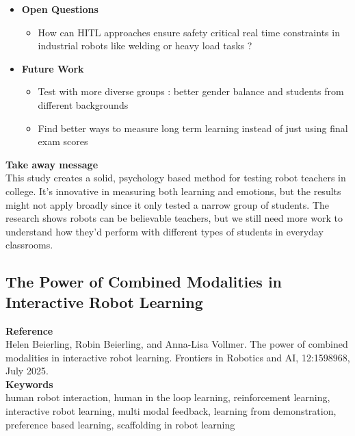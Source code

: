 \documentclass[report.tex]{subfiles}
\begin{document}
\begin{itemize}
    \item \noindent\textbf {Open Questions}
    \begin{itemize}
        \item    How can HITL approaches ensure safety critical real time constraints in industrial robots like welding or heavy load tasks ?

    \end{itemize}
    
    \item \noindent\textbf{Future Work}
    \begin{itemize}
        \item Test with more diverse groups  : better gender balance and students from different backgrounds 
        \item Find better ways to measure long term learning instead of just using final exam scores 
        
    \end{itemize}
\end{itemize}


\noindent\textbf{Take away message}  \\
This study creates a solid, psychology based method for testing robot teachers in college. It's innovative in measuring both learning and emotions, but the results might not apply broadly since it only tested a narrow group of students. The research shows robots can be believable teachers, but we still need more work to understand how they'd perform with different types of students in everyday classrooms. 













\subsection{The Power of Combined Modalities in Interactive Robot Learning} 

\noindent\textbf{Reference} \\
\cite{beierling_power_2025}Helen Beierling, Robin Beierling, and Anna-Lisa Vollmer. The power of combined modalities in
interactive robot learning. Frontiers in Robotics and AI, 12:1598968, July 2025.
\\


\noindent\textbf{Keywords} \\
human robot interaction, human in the loop learning, reinforcement learning,
interactive robot learning, multi modal feedback, learning from demonstration,
preference based learning, scaffolding in robot learning
   \\
\end{document}
